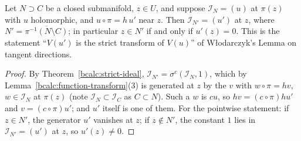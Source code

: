 \begin{corollary}
\label{bcalc:giraud-strict}
\upstreamleanok
Let \(N\supset C\) be a closed submanifold, \(z\in U\), and suppose \(\mathcal I_N=(u)\) at \(\pi(z)\) with \(u\) holomorphic, and
\(u\circ\pi=h\,u'\) near \(z\). Then \(\mathcal I_{N'}=(u')\) at \(z\), where \(N'=\overline{\pi^{-1}(N\setminus C)}\); in particular \(z\in N'\) if and only
if \(u'(z)=0\). This is the statement ``\(V(u')\) is the strict transform of \(V(u)\)'' of Włodarczyk's Lemma on tangent directions.
\end{corollary}
\begin{proof}
\upstreamleanok
By Theorem~\ref{bcalc:strict-ideal}, \(\mathcal I_{N'}=\sigma^{c}(\mathcal I_N,1)\), which by Lemma~\ref{bcalc:function-transform}(3) is generated at \(z\) by the
\(v\) with \(w\circ\pi=hv\), \(w\in\mathcal I_N\) at \(\pi(z)\) (note \(\mathcal I_N\subset\mathcal I_C\) as \(C\subset N\)). Such a \(w\) is \(cu\), so
\(hv=(c\circ\pi)hu'\) and \(v=(c\circ\pi)u'\); and \(u'\) itself is one of them. For the pointwise statement: if \(z\in N'\), the generator \(u'\)
vanishes at \(z\); if \(z\notin N'\), the constant \(1\) lies in \(\mathcal I_{N'}=(u')\) at \(z\), so \(u'(z)\ne0\).
\end{proof}

